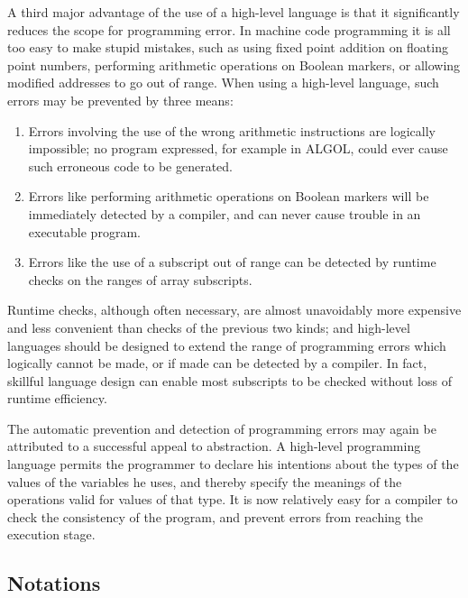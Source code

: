 A third major advantage of the use of a high-level language is that it significantly reduces the scope for programming error. In machine code programming it is all too easy to make stupid mistakes, such as using fixed point addition on floating point numbers, performing arithmetic operations on Boolean markers, or allowing modified addresses to go out of range. When using a high-level language, such errors may be prevented by three means:

\begin{enumerate}[wide, nosep, label=(\arabic*)]
	\item Errors involving the use of the wrong arithmetic instructions are logically impossible; no program expressed, for example in ALGOL, could ever cause such erroneous code to be generated.
	\item Errors like performing arithmetic operations on Boolean markers will be immediately detected by a compiler, and can never cause trouble in an executable program.
	\item Errors like the use of a subscript out of range can be detected by runtime checks on the ranges of array subscripts.
\end{enumerate}

Runtime checks, although often necessary, are almost unavoidably more expensive and less convenient than checks of the previous two kinds; and high-level languages should be designed to extend the range of programming errors which logically cannot be made, or if made can be detected by a compiler. In fact, skillful language design can enable most subscripts to be checked without loss of runtime efficiency.

The automatic prevention and detection of programming errors may again be attributed to a successful appeal to abstraction. A high-level programming language permits the programmer to declare his intentions about the types of the values of the variables he uses, and thereby specify the meanings of the operations valid for values of that type. It is now relatively easy for a compiler to check the consistency of the program, and prevent errors from reaching the execution stage.

\subsection{Notations}


